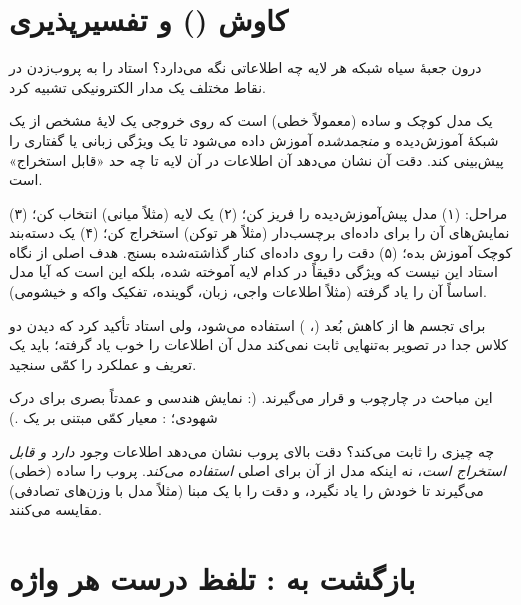 \section{کاوش () و تفسیرپذیری}
\label{sec:ch09-probing}

درون جعبهٔ سیاه شبکه هر لایه چه اطلاعاتی نگه می‌دارد؟ استاد  را به پروب‌زدن در نقاط مختلف یک مدار الکترونیکی تشبیه کرد.

\begin{definitionbox}{}
 یک مدل کوچک و ساده (معمولاً خطی) است که روی خروجی یک لایهٔ مشخص از یک شبکهٔ آموزش‌دیده و \emph{منجمد‌شده} آموزش داده می‌شود تا یک ویژگی زبانی یا گفتاری را پیش‌بینی کند. دقت آن نشان می‌دهد آن اطلاعات در آن لایه تا چه حد «قابل استخراج» است.
\end{definitionbox}

مراحل: (۱) مدل پیش‌آموزش‌دیده را فریز کن؛ (۲) یک لایه (مثلاً میانی) انتخاب کن؛ (۳) نمایش‌های آن را برای داده‌ای برچسب‌دار (مثلاً  هر توکن) استخراج کن؛ (۴) یک دسته‌بند کوچک آموزش بده؛ (۵) دقت را روی داده‌ای کنار گذاشته‌شده بسنج. هدف اصلی از نگاه استاد این نیست که ویژگی دقیقاً در کدام لایه آموخته شده، بلکه این است که آیا مدل اساساً آن را یاد گرفته (مثلاً اطلاعات واجی، زبان، گوینده، تفکیک واکه و خیشومی).



برای تجسم ها از کاهش بُعد (، ) استفاده می‌شود، ولی استاد تأکید کرد که دیدن دو کلاس جدا در تصویر به‌تنهایی ثابت نمی‌کند مدل آن اطلاعات را خوب یاد گرفته؛ باید یک  تعریف و عملکرد را کمّی سنجید.

این مباحث در چارچوب  و  قرار می‌گیرند. (: نمایش هندسی و عمدتاً بصری برای درک شهودی؛ : معیار کمّی مبتنی بر یک .)

\begin{correctionbox}{ چه چیزی را ثابت می‌کند؟}
دقت بالای پروب نشان می‌دهد اطلاعات \emph{وجود دارد و قابل استخراج است}، نه اینکه مدل از آن برای  اصلی \emph{استفاده می‌کند}. پروب را ساده (خطی) می‌گیرند تا خودش  را یاد نگیرد، و دقت را با یک مبنا (مثلاً مدل با وزن‌های تصادفی) مقایسه می‌کنند.
\end{correctionbox}

\section{بازگشت به : تلفظ درست هر واژه}

